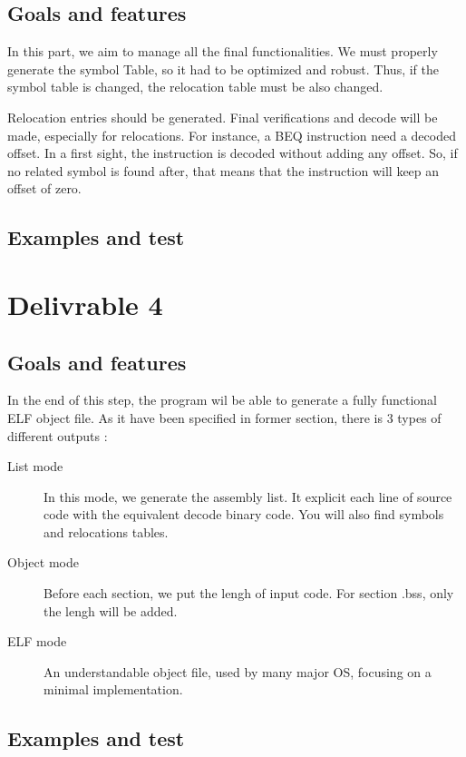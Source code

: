 \documentclass[twoside,twocolumn]{article}
\begin{document}
\subsection{Goals and features}
In this part, we aim to manage all the final functionalities. We must properly generate the symbol Table, so it had to be optimized and robust. Thus, if the symbol table is changed, the relocation table must be also changed.

Relocation entries should be generated. Final verifications and decode will be made, especially for relocations. For instance, a BEQ instruction need a decoded offset. In a first sight, the instruction is decoded without adding any offset. So, if no related symbol is found after, that means that the instruction will keep an offset of zero.

\subsection{Examples and test}


\section{Delivrable 4}

\subsection{Goals and features}
In the end of this step, the program wil be able to generate a fully functional ELF object file.
As it have been specified in former section, there is 3 types of different outputs :

\begin{description}
 \item[List mode] In this mode, we generate the assembly list. It explicit each line of source code with the equivalent decode binary code. You will also find symbols and relocations tables.
 \item[Object mode] Before each section, we put the lengh of input code. For section .bss, only the lengh will be added.
 \item[ELF mode] An understandable object file, used by many major OS, focusing on a minimal implementation.
\end{description}


\subsection{Examples and test}
\end{document}
